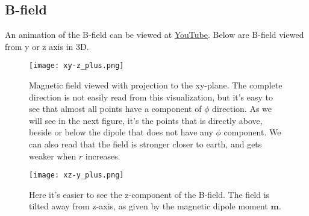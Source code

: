 \documentclass[11pt,a4paper]{article}
\begin{document}
\subsection{B-field}
An animation of the B-field can be viewed at \href{http://www.youtube.com/watch?v=2xm8lJ9Brn0}{YouTube}. Below are B-field viewed from y or z axis in 3D.
\begin{figure}[htbp] %
\begin{center}
\label{figure.B-field}
\texttt{[image: xy-z\_plus.png]}
\caption{Magnetic field viewed with projection to the xy-plane. The complete direction is not easily read from this visualization, but it's easy to see that almost all points have a component of $\phi$ direction. As we will see in the next figure, it's the points that is directly above, beside or below the dipole that does not have any $\phi$ component. We can also read that the field is stronger closer to earth, and gets weaker when $r$ increases.}
\end{center}
\end{figure}

\begin{figure}[htbp] %
\begin{center}
\label{figure.B-field}
\texttt{[image: xz-y\_plus.png]}
\caption{Here it's easier to see the z-component of the B-field. The field is tilted away from z-axis, as given by the magnetic dipole moment $\textbf{m}$.}
\end{center}
\end{figure}
\end{document}
